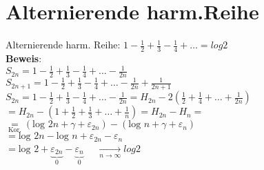\section{Alternierende harm.Reihe}
\newcommand{\altharm}{1-\frac{1}{2}+\frac{1}{3} - \frac{1}{4}+\dots}
Alternierende harm. Reihe: $\altharm = log 2$\medskip\\
\textbf{Beweis}:\\
$S_{2n} = \altharm - \frac{1}{2n}$\smallskip\\
$S_{2n+1}= \altharm -  \frac{1}{2n} + \frac{1}{2n+1}$\medskip\\
$S_{2n} = \altharm - \frac{1}{2n} = H_{2n}-2(\frac{1}{2}+\frac{1}{4}+\dots+\frac{1}{2n})$\smallskip\\
$=H_{2n} - (1+\frac{1}{2}+\frac{1}{3}+\dots+\frac{1}{n})=H_{2n}-H_n = $\smallskip\\
$\underset{\text{Kor.}}{=} (\text{log }2n+ \gamma + \varepsilon_{2n}) - (\text{log }n + \gamma + \varepsilon_n)$\smallskip\\
$=\text{log }2n - \text{log }n + \varepsilon_{2n}-\varepsilon_n$\smallskip\\
$=\text{log }2 + \underbrace{\varepsilon_{2n}}_0-\underbrace{\varepsilon_n}_0\quad$
$\underset{n\rightarrow\infty}{\rightarrow} log 2$\medskip\\

